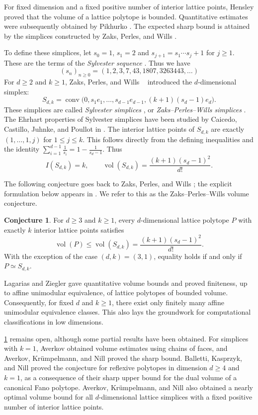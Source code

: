\documentclass[reqno, 11pt]{article}
\numberwithin{equation}{section}
\theoremstyle{definition}
\newtheorem{conjecture}[conjecture]{Conjecture}
\DeclareMathOperator{\vol}{vol}
\DeclareMathOperator{\conv}{conv}
\numberwithin{equation}{section}
\begin{document}
For fixed dimension and a fixed positive number of interior lattice points,
Hensley \cite[Theorem~3.6]{Hensley1983} proved that the volume of a lattice
polytope is bounded. Quantitative estimates were subsequently obtained by
Pikhurko \cite{Pikhurko2001}. The expected sharp bound is attained by the
simplices constructed by Zaks, Perles, and Wills \cite{ZPW1982}.

To define these simplices, let $s_0=1$, $s_1=2$ and
$s_{j+1}=s_1\cdots s_j+1$ for $j\ge1$. These are the terms of the
\emph{Sylvester sequence} \cite[OEIS; A000058]{Sloane23}.  Thus we have
$$(s_n)_{n\geq 0} = (1, 2, 3, 7, 43, 1807, 3263443, \ldots)$$
For $d\ge2$ and $k\ge1$, Zaks, Perles, and Wills ~\cite{ZPW1982} introduced the $d$-dimensional simplex:
\[
S_{d,k}=\conv\bigl(0,s_1e_1,\ldots,s_{d-1}e_{d-1},(k+1)(s_d-1)e_d\bigr).
\]
These simplices are called \emph{Sylvester simplices} \cite{CCJP2026}, or \emph{Zaks--Perles--Wills simplices} \cite{Ave20}. 
The Ehrhart properties of Sylvester simplices have been studied by Caicedo, Castillo, Juhnke, and Poullot in \cite{CCJP2026}.
The interior lattice points of $S_{d,k}$ are exactly
$(1,\ldots,1,j)$ for $1\le j\le k$. This follows directly from
the defining inequalities and the identity
$\sum_{i=1}^{d-1}\frac{1}{s_i}=1-\frac{1}{s_d-1}$. Thus
\[
I(S_{d,k})=k,\qquad
\vol(S_{d,k})=\frac{(k+1)(s_d-1)^2}{d!}.
\]

The following conjecture goes back to Zaks, Perles, and Wills \cite{ZPW1982}; the explicit formulation below appears in
\cite[Conjecture~1.5]{BK2016}. We refer to this as the Zaks--Perles--Wills volume conjecture.
\begin{conjecture}\label{ConjectureZPW}
For $d\ge3$ and $k\ge1$, every $d$-dimensional lattice polytope $P$
with exactly $k$ interior lattice points satisfies
\[
\vol(P)\le\vol(S_{d,k})=\frac{(k+1)(s_d-1)^2}{d!}.
\]
With the exception of the case $(d, k) = (3, 1)$, equality holds if and only if $P\simeq S_{d,k}$.
\end{conjecture}

Lagarias and Ziegler \cite{LZ91} gave quantitative volume bounds and proved finiteness, up to affine unimodular equivalence, of lattice polytopes of bounded volume. Consequently, for fixed $d$ and $k \ge 1$, there exist only finitely many affine unimodular equivalence classes. This also lays the groundwork for computational classifications in low dimensions.

\cref{ConjectureZPW} remains open, although some partial results have been obtained.
For simplices with $k=1$, Averkov \cite{Ave12} obtained volume estimates using chains of faces, and Averkov, Kr\"umpelmann, and Nill
\cite{AKN2015} proved the sharp bound.
Balletti, Kasprzyk, and Nill \cite[Corollary~1.2]{BKN22} proved the conjecture for reflexive polytopes in dimension $d\ge4$ and $k=1$, as a consequence of their sharp upper bound for the dual volume of a canonical Fano polytope. 
Averkov, Kr\"umpelmann, and Nill \cite{AKN2020} also obtained a nearly optimal volume bound for all $d$-dimensional lattice simplices with a fixed positive number of interior lattice points.
\end{document}
